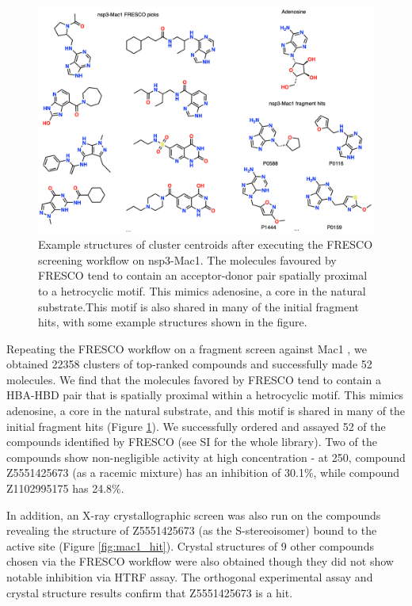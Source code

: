 \begin{figure}[!b]
    \centering
    \includegraphics[width=0.8\linewidth]{Chapters/Fresco/Figs/mac1_ligands.png}
    \caption{Example structures of cluster centroids after executing the FRESCO screening workflow on nsp3-Mac1. The molecules favoured by FRESCO tend to contain an acceptor-donor pair spatially proximal to a hetrocyclic motif. This mimics adenosine, a core in the natural substrate.This motif is also shared in many of the initial fragment hits, with some example structures shown in the figure.}
    \label{fig:mac1_ligands}
\end{figure}

Repeating the FRESCO workflow on a fragment screen against Mac1 \cite{Schuller2021Mac1Frag}, we obtained 22358 clusters of top-ranked compounds and successfully made 52 molecules. We find that the molecules favored by FRESCO tend to contain a HBA-HBD pair that is spatially proximal within a hetrocyclic motif. This mimics adenosine, a core in the natural substrate, and this motif is shared in many of the initial fragment hits (Figure \ref{fig:mac1_ligands}). We successfully ordered and assayed 52 of the compounds identified by FRESCO (see SI for the whole library).  Two of the compounds show non-negligible activity at high concentration - at 250\uM, compound Z5551425673 (as a racemic mixture) has an inhibition of 30.1\%, while compound Z1102995175 has 24.8\%.

In addition, an X-ray crystallographic screen was also run on the compounds revealing the structure of Z5551425673 (as the S-stereoisomer) bound to the active site (Figure \ref{fig:mac1_hit}). Crystal structures of 9 other compounds chosen via the FRESCO workflow were also obtained though they did not show notable inhibition via HTRF assay. The orthogonal experimental assay and crystal structure results confirm that Z5551425673 is a hit. 

